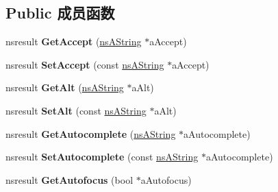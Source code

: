 \subsection*{Public 成员函数}
\begin{DoxyCompactItemize}
\item 
\mbox{\label{interfacens_i_d_o_m_h_t_m_l_input_element_a4da4c859713b111e306d836e9235c175}} 
nsresult {\bfseries Get\+Accept} (\hyperlink{structns_string_container}{ns\+A\+String} $\ast$a\+Accept)
\item 
\mbox{\label{interfacens_i_d_o_m_h_t_m_l_input_element_a900e2ce5deaf8d68b161e8c554e49856}} 
nsresult {\bfseries Set\+Accept} (const \hyperlink{structns_string_container}{ns\+A\+String} $\ast$a\+Accept)
\item 
\mbox{\label{interfacens_i_d_o_m_h_t_m_l_input_element_a727c375917755ec8a27fcabb3031f9cf}} 
nsresult {\bfseries Get\+Alt} (\hyperlink{structns_string_container}{ns\+A\+String} $\ast$a\+Alt)
\item 
\mbox{\label{interfacens_i_d_o_m_h_t_m_l_input_element_a47fbab260180b5328f9f77cd9c9859aa}} 
nsresult {\bfseries Set\+Alt} (const \hyperlink{structns_string_container}{ns\+A\+String} $\ast$a\+Alt)
\item 
\mbox{\label{interfacens_i_d_o_m_h_t_m_l_input_element_a5ad8830ffaaed992a67055a1447b3e95}} 
nsresult {\bfseries Get\+Autocomplete} (\hyperlink{structns_string_container}{ns\+A\+String} $\ast$a\+Autocomplete)
\item 
\mbox{\label{interfacens_i_d_o_m_h_t_m_l_input_element_adfa95b67587291abbc64b5ad53fa2eee}} 
nsresult {\bfseries Set\+Autocomplete} (const \hyperlink{structns_string_container}{ns\+A\+String} $\ast$a\+Autocomplete)
\item 
\mbox{\label{interfacens_i_d_o_m_h_t_m_l_input_element_a5cb5df435c7d66738463d22889e9cabf}} 
nsresult {\bfseries Get\+Autofocus} (bool $\ast$a\+Autofocus)
\item 

\end{DoxyCompactItemize}
